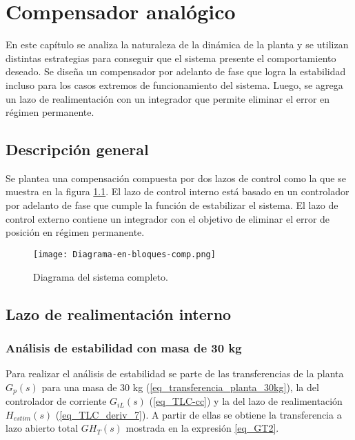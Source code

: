 \chapter{Compensador analógico}  \label{cap:Compensador Analogico}

En este capítulo se analiza la naturaleza de la dinámica de la planta y se utilizan distintas estrategias para conseguir que el sistema presente el comportamiento deseado. Se diseña un compensador por adelanto de fase que logra la estabilidad incluso para los casos extremos de funcionamiento del sistema. Luego, se agrega un lazo de realimentación con un integrador que permite eliminar el error en régimen permanente.

\section{Descripción general}


\noindent Se plantea una compensación compuesta por dos lazos de control como la que se muestra en la figura \ref{fig:diag-en-bloques-comp}. El lazo de control interno está basado en un controlador por adelanto de fase que cumple la función de estabilizar el sistema. El lazo de control externo contiene un integrador con el objetivo de eliminar el error de posición en régimen permanente.


\begin{figure}[H]
	\centering
	\texttt{[image: Diagrama-en-bloques-comp.png]}
	\caption{Diagrama del sistema completo.}
	\label{fig:diag-en-bloques-comp}
\end{figure}

\section{Lazo de realimentación interno}

\subsection{Análisis de estabilidad con masa de 30 kg}

\noindent Para realizar el análisis de estabilidad se parte de las transferencias de la planta $G_{p}(s)$ para una masa de 30 kg (\ref{eq_transferencia_planta_30kg}), la del controlador de corriente $G_{iL}(s)$ (\ref{eq_TLC-cc}) y la del lazo de realimentación $H_{estim}(s)$ (\ref{eq_TLC_deriv_7}). A partir de ellas se obtiene  la transferencia a lazo abierto total $GH_T(s)$ mostrada en la expresión \ref{eq_GT2}.


